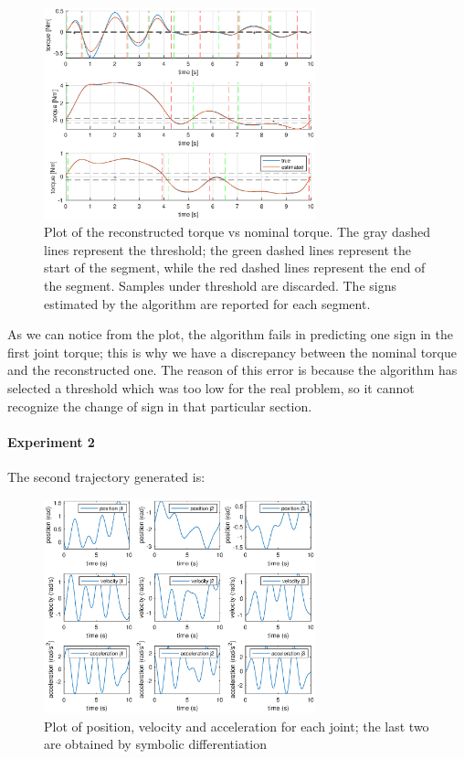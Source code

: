 \documentclass{article}
\begin{document}
\begin{figure}[!htbp]
\centering
\includegraphics[width=0.7\textwidth]{images/3-dof/results1.eps}
\caption{Plot of the reconstructed torque vs nominal torque. The gray dashed lines represent the threshold; the green dashed lines represent the start of the segment, while the red dashed lines represent the end of the segment. Samples under threshold are discarded. The signs estimated by the algorithm are reported for each segment.}
\end{figure}
\FloatBarrier

As we can notice from the plot, the algorithm fails in predicting one sign in the first joint torque; this is why we have a discrepancy between the nominal torque and the reconstructed one. The reason of this error is because the algorithm has selected a threshold which was too low for the real problem, so it cannot recognize the change of sign in that particular section.

\paragraph{Experiment 2}
The second trajectory generated is:
\begin{figure}[!htbp]
\centering
\includegraphics[width=0.7\textwidth]{images/3-dof/trajectory456.eps}
\caption{Plot of position, velocity and acceleration for each joint; the last two are obtained by symbolic differentiation}
\end{figure}
\FloatBarrier
\end{document}
